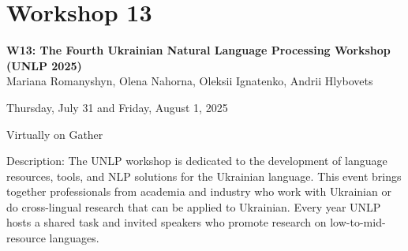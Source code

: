 \clearpage



\section[W13: The Fourth Ukrainian Natural Language Processing Workshop (UNLP 2025)]{Workshop 13}
\label{workshop_13_1}
\label{workshop_13_2}

\begin{center}
    {\Large \textbf{W13: The Fourth Ukrainian Natural Language Processing Workshop (UNLP 2025)}}\\

    Mariana Romanyshyn, Olena Nahorna, Oleksii Ignatenko, Andrii Hlybovets
    
    Thursday, July 31 and Friday, August 1, 2025
    
    Virtually on Gather

\end{center}

Description: The UNLP workshop is dedicated to the development of language resources, tools, and NLP solutions for the Ukrainian language. This event brings together professionals from academia and industry who work with Ukrainian or do cross-lingual research that can be applied to Ukrainian. Every year UNLP hosts a shared task and invited speakers who promote research on low-to-mid-resource languages.

